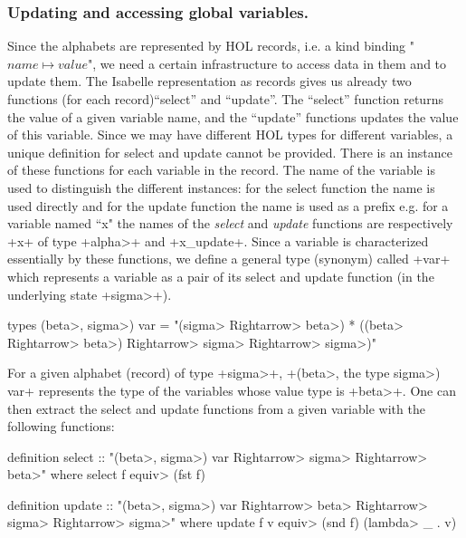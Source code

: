 \documentclass[11pt,a4paper]{article}
\begin{document}
\subsubsection{Updating and accessing global variables.}\label{sec:updating_global}
Since the alphabets are represented by HOL records, i.e. a kind binding "$name \mapsto value$",
we need a certain infrastructure to access data in them and to update them. The Isabelle representation as records gives
us already two functions (for each record)``select'' and ``update''. The ``select'' function returns the 
value of a given variable name, and the ``update'' functions updates the value of this variable. Since we may have different HOL types for different 
variables, a unique definition for select and update cannot be provided. There is an instance of these functions for each variable in the record. 
The name of the variable is used to distinguish the different instances: for the select function the name is used directly and for the update function 
the name is used as a prefix e.g. for a variable named ``x" the names of the \emph{select} and \emph{update} functions are respectively \inlineisar+x+ 
of type \inlineisar+\<alpha>+ and \inlineisar+x_update+.
Since a variable is characterized essentially by these functions, we define a general type (synonym) called \inlineisar+var+ which 
represents a variable as a pair of its select and update function (in the underlying state \inlineisar+\<sigma>+).

\begin{isar} 
 types (\<beta>, \<sigma>) var = "(\<sigma> \<Rightarrow>  \<beta>) * ((\<beta>  \<Rightarrow> \<beta>) \<Rightarrow> \<sigma> \<Rightarrow> \<sigma>)"
\end{isar}

For a given alphabet (record) of type \inlineisar+\<sigma>+, \inlineisar+(\<beta>, the type \<sigma>) var+ represents the type of the variables whose value type is \inlineisar+\<beta>+. 
One can then extract the select and update functions from a given variable with the following functions:
\begin{isar}
 definition select :: "(\<beta>, \<sigma>) var \<Rightarrow>   \<sigma> \<Rightarrow> \<beta>"
   where select f \<equiv>   (fst f)

 definition update :: "(\<beta>, \<sigma>) var \<Rightarrow>    \<beta> \<Rightarrow> \<sigma> \<Rightarrow> \<sigma>"
   where update f v \<equiv>   (snd f) (\<lambda> _ . v)
\end{isar}
\end{document}
